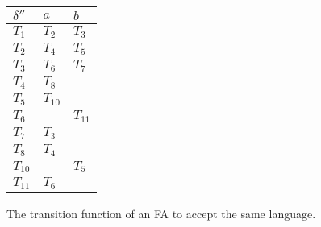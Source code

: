 \begin{fig}[tbh]
\begin{center}\begin{tabular}{l|ll}$\delta''$ & $\mathit{a}$ & $\mathit{b}$ \\ \hline $T_{1}$  & $T_{2}$ & $T_{3}$\\ $T_{2}$  & $T_{4}$ & $T_{5}$\\ $T_{3}$  & $T_{6}$ & $T_{7}$\\ $T_{4}$  & $T_{8}$ & \\$T_{5}$  & $T_{10}$ & \\$T_{6}$  &  & $T_{11}$\\ $T_{7}$  & $T_{3}$ & \\$T_{8}$  & $T_{4}$ & \\$T_{10}$  &  & $T_{5}$\\ $T_{11}$  & $T_{6}$ & \end{tabular}
\caption{The transition function of an FA to accept the same language.}\label{Fig:two}
\end{center}

\end{fig}

